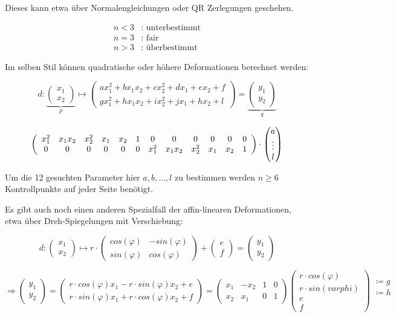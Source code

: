 \documentclass[ngerman]{article}
\theoremstyle{plain}
\theoremstyle{definition}
\numberwithin{equation}{section}
\newcommand{\C}[0]{
    \cdot
}
\newcommand{\x}[0] {
  \boldsymbol{x}
}
\newcommand{\y}[0] {
    \boldsymbol{y}
}
\newcommand{\mat}[1] {
\begin{pmatrix} #1 \end{pmatrix}
}
\begin{document}
Dieses kann etwa über Normalengleichungen oder QR Zerlegungen geschehen.

\begin{align*}
    n<3&\text{: unterbestimmt}\\
    n=3&\text{: fair}\\
    n>3&\text{: überbestimmt}
\end{align*}

Im selben Stil können quadratische oder höhere Deformationen berechnet werden:

\[d:\underbrace{\mat{x_1 \\ x_2}}_{p} \mapsto \mat{ax_1^2 + b x_1 x_2 + c x_2^2 + d x_1 + e x_2 +f\\ g x_1^2 + hx_1x_2 + ix_2^2 + jx_1 + hx_2 +l} = \underbrace{\mat{y_1\\y_2}}_{q}\]

\[\left(
    \begin{array}{*{12}c}
        x_1^2 & x_1x_2 & x_2^2 & x_1 & x_2 & 1 & 0 & 0 & 0 & 0 & 0 & 0\\
        0 & 0 & 0 & 0 & 0 & 0 & x_1^2 & x_1x_2 & x_2^2 & x_1 & x_2 & 1
    \end{array}
    \right) \C \mat{a\\ \vdots \\ l}\]

Um die 12 gesuchten Parameter hier $a,b, ... ,l$ zu bestimmen werden $n \geq 6$ Kontrollpunkte auf jeder Seite benötigt.

Es gibt auch noch einen anderen Spezialfall der affin-linearen Deformationen, etwa über Dreh-Spiegelungen mit Verschiebung:

\[d: \mat{x_1\\x_2} \mapsto r \C \mat{cos(\varphi) & -sin(\varphi)\\ sin(\varphi) & cos(\varphi)} + \mat{e\\f}=\mat{y_1\\y_2}\]

\[\Rightarrow \mat{y_1\\y_2} = \mat{r \C cos(\varphi)x_1 -r \C sin(\varphi)x_2 + e\\ r \C sin(\varphi)x_1 + r \C cos(\varphi) x_2 + f} = \mat{x_1 & -x_2 & 1 & 0\\ x_2 & x_1 & 0 & 1} \mat{r \C cos(\varphi)\\ r \C sin(varphi)\\e \\ f} \begin{array}{c}
     \coloneqq g\\ \coloneqq h\\ \ \\ \
\end{array}\]
\end{document}
